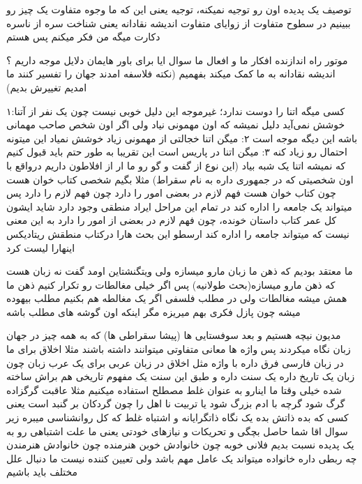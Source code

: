 \documentclass{article}
\begin{document}
	 توصیف یک پدیده اون رو توجیه نمیکنه، توجیه یعنی این که ما وجوه متفاوت یک چیز رو ببینیم
	در سطوح متفاوت از زوایای متفاوت
	 اندیشه نقادانه یعنی شناخت سره از ناسره دکارت میگه من فکر میکنم پس هستم
	
	 موتور راه اندازنده افکار ما و افعال ما سوال ایا برای باور هایمان دلایل موجه داریم ؟ اندیشه نقادانه به ما کمک میکند
	بفهمیم (نکته فلاسفه امدند جهان را تفسیر کنند ما امدیم تغییرش بدیم) 
	
	 ۱:کسی میگه اتنا را دوست ندارد؛ غیرموجه این دلیل خوبی نیست چون یک نفر از آتنا خوشش نمی‌آید دلیل
	نمیشه که اون مهمونی نیاد ولی اگر اون شخص صاحب مهمانی باشه این دیگه موجه است ۲: میگن اتنا خجالتی از مهمونی زیاد خوشش نمیاد این میتونه
	احتمال رو زیاد کنه ۳: میگن اتنا در پاریس است این تقریبا به طور حتم باید قبول کنیم که نمیشه اتنا یک شبه بیاد (این نوع از گفت و گو 
	رو ما ار از افلاطون داریم درواقع با اون شخصیتی که در جمهوری داره به نام سقراط)
	 مثلا بگیم شخصی کتاب خوان هست چون کتاب خوان هست فهم لازم در بعضی 
	امور را دارد چون فهم لازم را دارد پس میتواند یک جامعه را اداره کند در تمام این مراحل ایراد منطقی وجود دارد شاید ایشون کل عمر کتاب 
	داستان خونده، چون فهم لازم در بعضی از امور را دارد به این معنی نیست که میتواند جامعه را اداره کند ارسطو این بحث هارا درکتاب منطقش
	ریتادیکس اینهارا لیست کرد
	
	 ما معتقد بودیم که ذهن ما زبان مارو میسازه ولی ویتگنشتاین اومد گفت نه زبان هست که ذهن مارو میسازه(بحث طولانیه) 
	پس اگر خیلی مغالطات رو تکرار کنیم ذهن ما همش میشه مغالطات ولی در مطلب فلسفی اگر یک مغالطه هم بکنیم مطلب بیهوده میشه چون پازل فکری 
	بهم میریزه مگر اینکه اون گوشه های مطلب باشه
	
	 مدیون نیچه هستیم و بعد سوفستایی ها (پیشا سقراطی ها) که به همه چیز در جهان زبان نگاه میکردند پس
	واژه ها معانی متفاوتی میتوانند داشته باشند مثلا اخلاق برای ما در زبان فارسی فرق داره با واژه مثل اخلاق در زبان عربی برای یک عرب زبان
	چون زبان یک تاریخ داره یک سنت داره و طبق این سنت یک مفهوم تاریخی هم براش ساخته شده خیلی وقتا ما اینارو به عنوان غلط مصطلح استفاده 
	میکنیم مثلا عاقبت گرگزاده گرگ شود گرچه با ادم بزرگ شود یا تربیت نا اهل را چون گردکان بر گنبد است یعنی کسی که بده ذاتش بده یک نگاه
	ذاتگرایانه و اشتباه غلط  که کل روانشناسی میبره زیر سوال اقا شما حاصل بچگی و تحریکات و نیازهای خودتی
	 یعنی ما علت اشتباهی رو به یک پدیده نسبت بدیم فلانی خوبه چون خانوادش خوبن هنرمنده چون خانوادش هنرمندن
	چه ربطی داره خانواده میتواند یک عامل مهم باشد ولی تعیین کننده نیست ما دنبال علل مختلف باید باشیم
	
\end{document}
